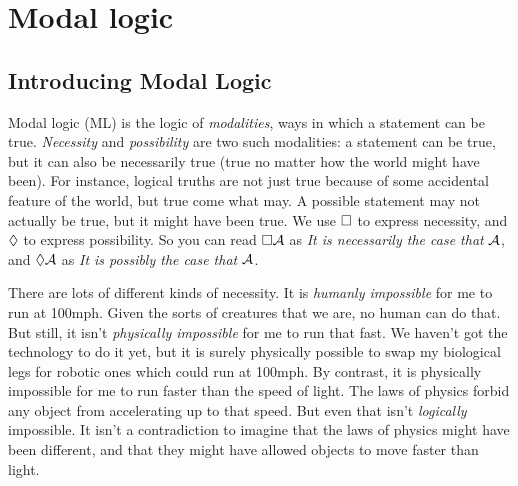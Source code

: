 
\part{Modal logic}
\label{ch.ML}

%

\chapter{Introducing Modal Logic}
\label{Intro}

Modal logic (ML) is the logic of \emph{modalities}, ways in which a statement can be true. \emph{Necessity} and \emph{possibility} are two such modalities: a statement can be true, but it can also be necessarily true (true no matter how the world might have been). For instance, logical truths are not just true because of some accidental feature of the world, but true come what may. A possible statement may not actually be true, but it might have been true. We use $\Box$ to express necessity, and $\Diamond$ to express possibility. So you can read $\Box \mathcal{A}$ as \emph{It is necessarily the case that} $\mathcal{A}$, and $\Diamond \mathcal{A}$ as \emph{It is possibly the case that} $\mathcal{A}$.

There are lots of different kinds of necessity. It is \emph{humanly impossible} for me to run at 100mph. Given the sorts of creatures that we are, no human can do that. But still, it isn't \emph{physically impossible} for me to run that fast. We haven't got the technology to do it yet, but it is surely physically possible to swap my biological legs for robotic ones which could run at 100mph. By contrast, it is physically impossible for me to run faster than the speed of light. The laws of physics forbid any object from accelerating up to that speed. But even that isn't \emph{logically} impossible. It isn't a contradiction to imagine that the laws of physics might have been different, and that they might have allowed objects to move faster than light.

